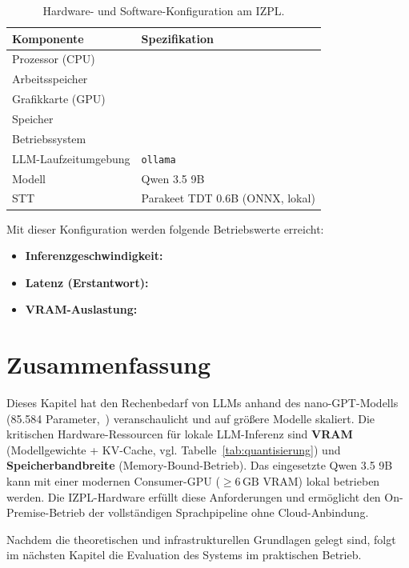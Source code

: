 \begin{table}[H]
    \centering
    \small
    \begin{tabular}{l l}
        \toprule
        Komponente & Spezifikation \\
        \midrule
        Prozessor (CPU)    & %
                             \\
        Arbeitsspeicher    & %
                             \\
        Grafikkarte (GPU)  & %
                             \\
        Speicher            & %
                             \\
        Betriebssystem     & %
                             \\
        \midrule
        LLM-Laufzeitumgebung & \texttt{ollama} \\
        Modell              & Qwen 3.5 9B \\
        STT                 & Parakeet TDT 0.6B (ONNX, lokal) \\
        \bottomrule
    \end{tabular}
    \caption{Hardware- und Software-Konfiguration am IZPL.}
    \label{tab:izpl_hardware}
\end{table}

Mit dieser Konfiguration werden folgende Betriebswerte erreicht:
\begin{itemize}
    \item \textbf{Inferenzgeschwindigkeit:} %
    \item \textbf{Latenz (Erstantwort):} %
    \item \textbf{VRAM-Auslastung:} %
\end{itemize}

\section{Zusammenfassung}

Dieses Kapitel hat den Rechenbedarf von LLMs anhand des nano-GPT-Modells
(85.584 Parameter,~\cite{bycroft_llm}) veranschaulicht und auf
größere Modelle skaliert. Die kritischen Hardware-Ressourcen für lokale
LLM-Inferenz sind \textbf{VRAM} (Modellgewichte + KV-Cache, vgl.
Tabelle~\ref{tab:quantisierung}) und \textbf{Speicherbandbreite}
(Memory-Bound-Betrieb). Das eingesetzte Qwen 3.5 9B kann mit einer
modernen Consumer-GPU ($\geq 6\,\text{GB}$ VRAM) lokal betrieben werden.
Die IZPL-Hardware erfüllt diese Anforderungen und ermöglicht den
On-Premise-Betrieb der vollständigen Sprachpipeline ohne Cloud-Anbindung.

Nachdem die theoretischen und infrastrukturellen Grundlagen gelegt sind,
folgt im nächsten Kapitel die Evaluation des Systems im praktischen Betrieb.
